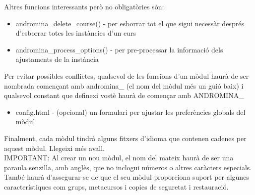 \documentclass[a4paper]{report}  %
\begin{document}
Altres funcions interessants però no obligatòries són: 
\begin{itemize}
\item andromina\_delete\_course() - per esborrar tot el que sigui necessàr després d'esborrar totes les instàncies d'un curs 
\item andromina\_process\_options() - per pre-processar la informació dels ajustaments de la instància 
\end{itemize}
Per evitar possibles conflictes, qualsevol de les funcions d'un mòdul haurà de ser nombrada començant amb andromina\_ (el nom del mòdul més un guió baix) i qualsevol constant que definexi vostè haurà de començar amb ANDROMINA\_ 
\begin{itemize}
\item config.html - (opcional) un formulari per ajustar les preferències globals del mòdul 
\end{itemize}
Finalment, cada mòdul tindrà alguns fitxers d'idioma que contenen cadenes per aquest mòdul. Llegeixi més avall.\\ 
IMPORTANT: Al crear un nou mòdul, el nom del mateix haurà de ser una paraula senzilla, amb anglès, que no inclogui números o altres caràcters especials. També haurà d'assegurar-se de que el seu mòdul proporciona suport per algunes característiques com grups, metacursos i copies de seguretat i restauració.\\
\end{document}
